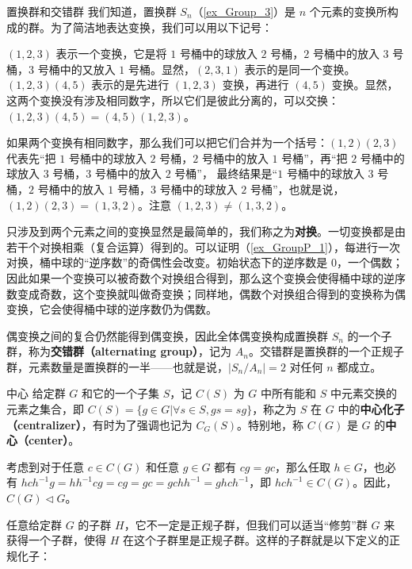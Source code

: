 \begin{example}{置换群和交错群}\label{ex_NormSG_5}
我们知道，置换群 $S_n$（\autoref{ex_Group_3}）是 $n$ 个元素的变换所构成的群。为了简洁地表达变换，我们可以用以下记号：

$(1,2,3)$ 表示一个变换，它是将 $1$ 号桶中的球放入 $2$ 号桶，$2$ 号桶中的放入 $3$ 号桶，$3$ 号桶中的又放入 $1$ 号桶。显然，$(2,3,1)$ 表示的是同一个变换。$(1,2,3)(4,5)$ 表示的是先进行 $(1,2,3)$ 变换，再进行 $(4,5)$ 变换。显然，这两个变换没有涉及相同数字，所以它们是彼此分离的，可以交换：$(1,2,3)(4,5)=(4,5)(1,2,3)$。

如果两个变换有相同数字，那么我们可以把它们合并为一个括号：$(1,2)(2,3)$ 代表先“把 $1$ 号桶中的球放入 $2$ 号桶，$2$ 号桶中的放入 $1$ 号桶”，再“把 $2$ 号桶中的球放入 $3$ 号桶，$3$ 号桶中的放入 $2$ 号桶”， 最终结果是“$1$ 号桶中的球放入 $3$ 号桶，$2$ 号桶中的放入 $1$ 号桶，$3$ 号桶中的球放入 $2$ 号桶”，也就是说，$(1,2)(2,3)=(1,3,2)$。注意 $(1,2,3)\not=(1,3,2)$。

只涉及到两个元素之间的变换显然是最简单的，我们称之为\textbf{对换}。一切变换都是由若干个对换相乘（复合运算）得到的。可以证明（\autoref{ex_GroupP_1}），每进行一次对换，桶中球的“逆序数”的奇偶性会改变。初始状态下的逆序数是 $0$，一个偶数；因此如果一个变换可以被奇数个对换组合得到，那么这个变换会使得桶中球的逆序数变成奇数，这个变换就叫做奇变换；同样地，偶数个对换组合得到的变换称为偶变换，它会使得桶中球的逆序数仍为偶数。

偶变换之间的复合仍然能得到偶变换，因此全体偶变换构成置换群 $S_n$ 的一个子群，称为\textbf{交错群（alternating group）}，记为 $A_n$。交错群是置换群的一个正规子群，元素数量是置换群的一半——也就是说，$|S_n/A_n|=2$ 对任何 $n$ 都成立。
\end{example}

\begin{example}{中心}\label{ex_NormSG_1}
给定群 $G$ 和它的一个子集 $S$，记 $C(S)$ 为 $G$ 中所有能和 $S$ 中元素交换的元素之集合，即 $C(S)=\{g\in G|\forall s\in S, gs=sg\}$，称之为 $S$ 在 $G$ 中的\textbf{中心化子（centralizer）}，有时为了强调也记为 $C_G(S)$。特别地，称 $C(G)$ 是 $G$ 的\textbf{中心（center）}。

考虑到对于任意 $c\in C(G)$ 和任意 $g\in G$ 都有 $cg=gc$，那么任取 $h\in G$，也必有 $hch^{-1}g=hh^{-1}cg=cg=gc=gchh^{-1}=ghch^{-1}$，即 $hch^{-1}\in C(G)$。因此，$C(G)\lhd G$。
\end{example}


任意给定群 $G$ 的子群 $H$，它不一定是正规子群，但我们可以适当“修剪”群 $G$ 来获得一个子群，使得 $H$ 在这个子群里是正规子群。这样的子群就是以下定义的正规化子：


